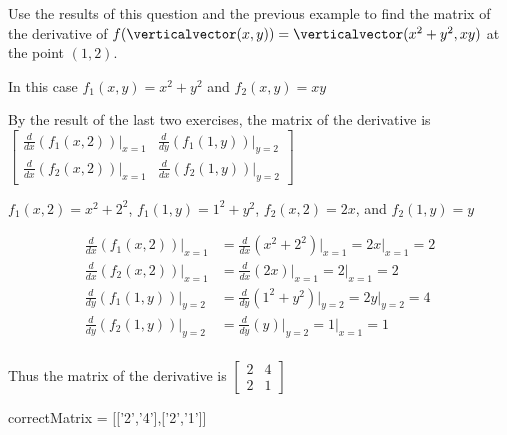 \documentclass{ximera}
\begin{document}
\begin{question}
	Use the results of this question and the previous example  to find the matrix of the derivative of  $f(\verticalvector(x,y)) = \verticalvector(x^2+y^2,xy)$
	at the point \((1,2)\).
	\begin{solution}
		\begin{hint}
			In this case  $f_1(x,y) = x^2+y^2$ and $f_2(x,y) = xy$
		\end{hint}
		\begin{hint}
			By the result of the last two exercises, the matrix of the derivative is \(\begin{bmatrix} \frac{d}{dx}(f_1(x,2))\big|_{x=1} & \frac{d}{dy}(f_1(1,y))\big|_{y=2}
			\\ \frac{d}{dx}(f_2(x,2))\big|_{x=1} & \frac{d}{dx}(f_2(1,y))\big|_{y=2}\end{bmatrix}\)
		\end{hint}
		\begin{hint}
			$f_1(x,2) = x^2+2^2$,  $f_1(1,y) = 1^2+y^2$,  $f_2(x,2) = 2x$, and $f_2(1,y) = y$
		\end{hint}
		\begin{hint}
			\begin{align*}	
			\frac{d}{dx}(f_1(x,2))\big|_{x=1} &= \frac{d}{dx} \left( x^2+2^2\right)\big|_{x=1} = 2x\big|_{x=1}=2\\
			\frac{d}{dx}(f_2(x,2))\big|_{x=1} &= \frac{d}{dx} \left( 2x\right)\big|_{x=1} = 2\big|_{x=1}=2\\
			\frac{d}{dy}(f_1(1,y))\big|_{y=2} &= \frac{d}{dy} \left( 1^2+y^2\right)\big|_{y=2} = 2y\big|_{y=2}=4\\
			\frac{d}{dy}(f_2(1,y))\big|_{y=2} &= \frac{d}{dy} \left(y\right)\big|_{y=2} = 1\big|_{x=1}=1\\
			\end{align*}
		\end{hint}
		\begin{hint}
			Thus the matrix of the derivative is \(\begin{bmatrix} 2&4\\2&1 \end{bmatrix}\)
		\end{hint}
		\begin{matrix-answer}
			correctMatrix = [['2','4'],['2','1']]
		\end{matrix-answer}
	\end{solution}
\end{question}
\end{document}
